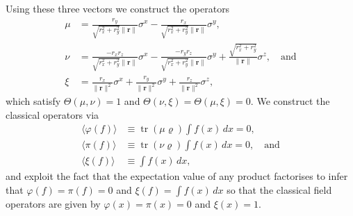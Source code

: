 \documentclass[prl,twocolumn,lengthcheck,superscriptaddress]{revtex4-1}
\newcommand{\tr}{\operatorname{tr}}
\theoremstyle{definition}
\theoremstyle{remark}
\begin{document}
Using these three vectors we construct the operators
\begin{equation}\label{eq:mftsymp}
	\begin{split}
	\mu &= \frac{r_y}{\sqrt{r_x^2+r_y^2}\|\mathbf{r}\|} \sigma^x - \frac{r_x}{\sqrt{r_x^2+r_y^2}\|\mathbf{r}\|} \sigma^y, \\
	\nu &= \frac{-r_xr_z}{\sqrt{r_x^2+r_y^2}\|\mathbf{r}\|} \sigma^x - \frac{-r_yr_z}{\sqrt{r_x^2+r_y^2}\|\mathbf{r}\|} \sigma^y + \frac{\sqrt{r_x^2+r_y^2}}{\|\mathbf{r}\|}\sigma^z,\quad \text{and}\\
	\xi &= \frac{r_x}{\|\mathbf{r}\|^2} \sigma^x + \frac{r_y}{\|\mathbf{r}\|^2} \sigma^y +   \frac{r_z}{\|\mathbf{r}\|^2} \sigma^z,
	\end{split}
\end{equation}
which satisfy $\Theta(\mu,\nu) = 1$ and $\Theta(\nu,\xi) = \Theta(\mu,\xi) = 0$. We construct the classical operators via
\begin{equation}
	\begin{split}
		\langle \varphi(f)\rangle &\equiv \tr(\mu\varrho) \int f(x)\,dx = 0,\\
		\langle \pi(f) \rangle &\equiv \tr(\nu\varrho) \int f(x)\,dx = 0, \quad \text{and}\\
		\langle \xi(f) \rangle &\equiv \int f(x)\,dx,
	\end{split}
\end{equation}
and exploit the fact that the expectation value of any product factorises to infer that $\varphi(f) =  \pi(f) = 0$  and $\xi(f) = \int f(x)\,dx$ so that the classical field operators are given by $\varphi(x) = \pi(x) = 0$ and $\xi(x) = 1$. 
\end{document}

